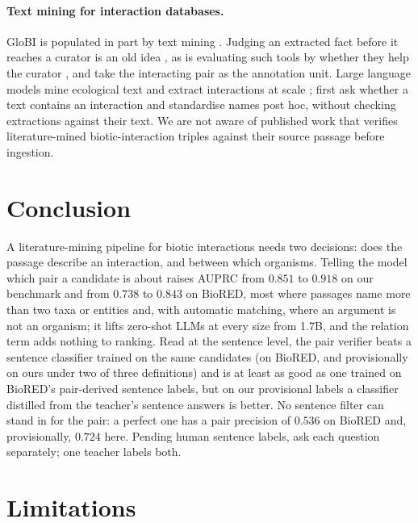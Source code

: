 \documentclass[11pt]{article}
\begin{document}
\paragraph{Text mining for interaction databases.}
GloBI \citep{poelen2014global} is populated in part by text mining \citep{dimitrova2020semantic}.
Judging an extracted fact before it reaches a curator is an old idea
\citep{rodriguezesteban2006imitating}, as is evaluating such tools by whether they help the curator
\citep{hirschman2012biocuration,britan2018nexta5,lee2018scaling}, and \citet{cuzick2023interspecies}
take the interacting pair as the annotation unit. Large language models mine ecological text
\citep{farrell2024landscape,dsouza2025mining} and extract interactions at scale \citep{keck2025extracting,zou2026llm};
\citet{zou2026llm} first ask whether a text contains an interaction and standardise names post hoc,
without checking extractions against their text. We are not aware of published work that verifies
literature-mined biotic-interaction triples against their source passage before ingestion.

\section{Conclusion}
\label{sec:conclusion}

A literature-mining pipeline for biotic interactions needs two decisions: does the passage describe
an interaction, and between which organisms. Telling the model which pair a candidate is about
raises AUPRC from $0.851$ to $0.918$ on our benchmark and from $0.738$ to $0.843$ on BioRED, most
where passages name more than two taxa or entities and, with automatic matching, where an argument
is not an organism; it lifts zero-shot LLMs at every size from 1.7B, and the relation term adds
nothing to ranking. Read at the sentence level, the pair verifier beats a sentence classifier trained on the
same candidates (on BioRED, and provisionally on ours under two of three definitions) and is at least as
good as one trained on BioRED's pair-derived sentence labels, but on our provisional labels a classifier
distilled from the teacher's sentence answers is better. No sentence filter can stand in for the
pair: a perfect one has a pair precision of $0.536$ on BioRED and, provisionally, $0.724$ here. Pending
human sentence labels, ask each question separately; one teacher labels both.

\section*{Limitations}
\end{document}
